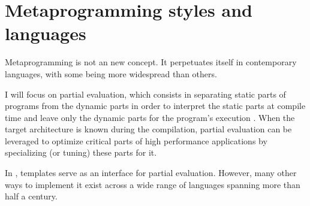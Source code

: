 \documentclass[../main]{subfiles}
\begin{document}
\section{
  Metaprogramming styles and languages
}

Metaprogramming is not an new concept. It perpetuates itself in contemporary
languages, with some being more widespread than others.

I will focus on partial evaluation, which consists in separating
static parts of programs from the dynamic parts in order to interpret
the static parts at compile time and leave only the dynamic parts for the
program's execution \cite{10.1145/243439.243447, 10.1023/A:1010095604496}.
When the target architecture is known during the compilation, partial evaluation
can be leveraged to optimize critical parts of high performance applications
by specializing (or tuning) these parts for it.

In \cpp, templates serve as an interface for partial evaluation.
However, many other ways to implement it exist across a wide range of languages
spanning more than half a century.
\end{document}

